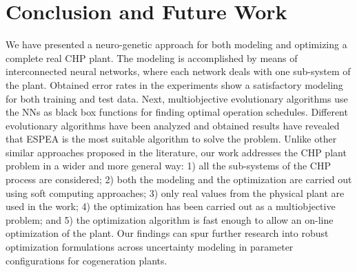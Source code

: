 \section{Conclusion and Future Work}

We have presented a neuro-genetic approach for both modeling and optimizing a complete real CHP plant. The modeling is accomplished by means of interconnected neural networks, where each network deals with one sub-system of the plant. Obtained error rates in the experiments show a satisfactory modeling for both training and test data. Next, multiobjective evolutionary algorithms use the NNs as black box functions for finding optimal operation schedules. Different evolutionary algorithms have been analyzed and obtained results have revealed that ESPEA is the most suitable algorithm to solve the problem. Unlike other similar approaches proposed in the literature, our work addresses the CHP plant problem in a wider and more general way: 1) all the sub-systems of the CHP process are considered; 2) both the modeling and the optimization are carried out using soft computing approaches; 3) only real values from the physical plant are used in the work; 4) the optimization has been carried out as a multiobjective problem; and 5) the optimization algorithm is fast enough to allow an on-line optimization of the plant. Our findings can spur further research into robust optimization formulations across uncertainty modeling in parameter configurations for cogeneration plants.

